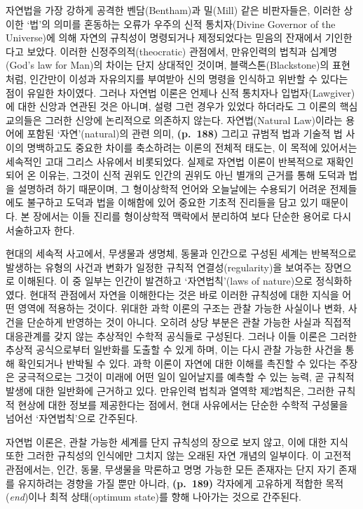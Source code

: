 자연법을 가장 강하게 공격한 벤담(Bentham)과 밀(Mill) 같은 비판자들은,
이러한 상이한 `법'의 의미를 혼동하는 오류가 우주의 신적 통치자(Divine
Governor of the Universe)에 의해 자연의 규칙성이 명령되거나 제정되었다는
믿음의 잔재에서 기인한다고 보았다. 이러한 신정주의적(theocratic)
관점에서, 만유인력의 법칙과 십계명(God's law for Man)의 차이는 단지
상대적인 것이며, 블랙스톤(Blackstone)의 표현처럼, 인간만이 이성과
자유의지를 부여받아 신의 명령을 인식하고 위반할 수 있다는 점이 유일한
차이였다. 그러나 자연법 이론은 언제나 신적 통치자나 입법자(Lawgiver)에
대한 신앙과 연관된 것은 아니며, 설령 그런 경우가 있었다 하더라도 그
이론의 핵심 교의들은 그러한 신앙에 논리적으로 의존하지 않는다.
자연법(Natural Law)이라는 용어에 포함된 `자연'(natural)의 관련 의미,
\textbf{(p.~188)} 그리고 규범적 법과 기술적 법 사이의 명백하고도 중요한
차이를 축소하려는 이론의 전체적 태도는, 이 목적에 있어서는 세속적인 고대
그리스 사유에서 비롯되었다. 실제로 자연법 이론이 반복적으로 재확인되어
온 이유는, 그것이 신적 권위도 인간의 권위도 아닌 별개의 근거를 통해
도덕과 법을 설명하려 하기 때문이며, 그 형이상학적 언어와 오늘날에는
수용되기 어려운 전제들에도 불구하고 도덕과 법을 이해함에 있어 중요한
기초적 진리들을 담고 있기 때문이다. 본 장에서는 이들 진리를 형이상학적
맥락에서 분리하여 보다 단순한 용어로 다시 서술하고자 한다.

현대의 세속적 사고에서, 무생물과 생명체, 동물과 인간으로 구성된 세계는
반복적으로 발생하는 유형의 사건과 변화가 일정한 규칙적
연결성(regularity)을 보여주는 장면으로 이해된다. 이 중 일부는 인간이
발견하고 `자연법칙'(laws of nature)으로 정식화하였다. 현대적 관점에서
자연을 이해한다는 것은 바로 이러한 규칙성에 대한 지식을 어떤 영역에
적용하는 것이다. 위대한 과학 이론의 구조는 관찰 가능한 사실이나 변화,
사건을 단순하게 반영하는 것이 아니다. 오히려 상당 부분은 관찰 가능한
사실과 직접적 대응관계를 갖지 않는 추상적인 수학적 공식들로 구성된다.
그러나 이들 이론은 그러한 추상적 공식으로부터 일반화를 도출할 수 있게
하며, 이는 다시 관찰 가능한 사건을 통해 확인되거나 반박될 수 있다. 과학
이론이 자연에 대한 이해를 촉진할 수 있다는 주장은 궁극적으로는 그것이
미래에 어떤 일이 일어날지를 예측할 수 있는 능력, 곧 규칙적 발생에 대한
일반화에 근거하고 있다. 만유인력 법칙과 열역학 제2법칙은, 그러한 규칙적
현상에 대한 정보를 제공한다는 점에서, 현대 사유에서는 단순한 수학적
구성물을 넘어선 `자연법칙'으로 간주된다.

자연법 이론은, 관찰 가능한 세계를 단지 규칙성의 장으로 보지 않고, 이에
대한 지식 또한 그러한 규칙성의 인식에만 그치지 않는 오래된 자연 개념의
일부이다. 이 고전적 관점에서는, 인간, 동물, 무생물을 막론하고 명명
가능한 모든 존재자는 단지 자기 존재를 유지하려는 경향을 가질 뿐만
아니라, \textbf{(p.~189)} 각자에게 고유하게 적합한 목적(\emph{end})이나
최적 상태(optimum state)를 향해 나아가는 것으로 간주된다.

